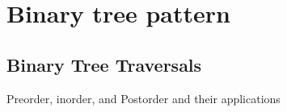 
\section{Binary tree pattern}\label{sec:binaryTreePattern}

\label{Evernote:Printing a Binary Tree in Level Order}

\label{Evernote:Largest BST Subtree}

\subsection{Binary Tree Traversals}

Preorder, inorder, and Postorder and their applications
